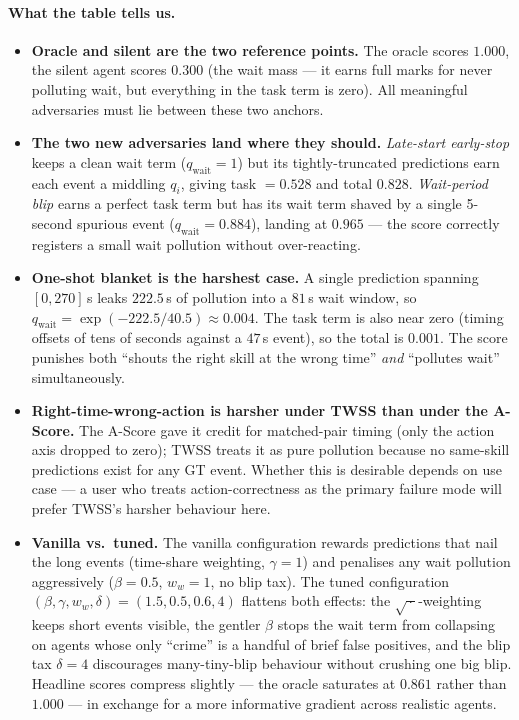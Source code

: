 \documentclass[11pt]{article}
\newcommand{\qi}{q_i}
\newcommand{\qwait}{q_{\text{wait}}}
\begin{document}
\paragraph{What the table tells us.}
\begin{itemize}
  \item \textbf{Oracle and silent are the two reference points.} The
    oracle scores $1.000$, the silent agent scores $0.300$ (the wait
    mass --- it earns full marks for never polluting wait, but
    everything in the task term is zero). All meaningful adversaries
    must lie between these two anchors.
  \item \textbf{The two new adversaries land where they should.}
    \emph{Late-start early-stop} keeps a clean wait term ($\qwait =
    1$) but its tightly-truncated predictions earn each event a
    middling $\qi$, giving task $= 0.528$ and total $0.828$.
    \emph{Wait-period blip} earns a perfect task term but has its
    wait term shaved by a single 5-second spurious event ($\qwait =
    0.884$), landing at $0.965$ --- the score correctly registers a
    small wait pollution without over-reacting.
  \item \textbf{One-shot blanket is the harshest case.} A single
    prediction spanning $[0, 270]$\,s leaks $222.5$\,s of pollution
    into a $81$\,s wait window, so $\qwait = \exp(-222.5 / 40.5)
    \approx 0.004$. The task term is also near zero (timing offsets
    of tens of seconds against a $47$\,s event), so the total is
    $0.001$. The score punishes both ``shouts the right skill at the
    wrong time'' \emph{and} ``pollutes wait'' simultaneously.
  \item \textbf{Right-time-wrong-action is harsher under TWSS than
    under the A-Score.} The A-Score gave it credit for matched-pair
    timing (only the action axis dropped to zero); TWSS treats it as
    pure pollution because no same-skill predictions exist for any
    GT event. Whether this is desirable depends on use case --- a
    user who treats action-correctness as the primary failure mode
    will prefer TWSS's harsher behaviour here.
  \item \textbf{Vanilla vs.\ tuned.} The vanilla configuration
    rewards predictions that nail the long events (time-share
    weighting, $\gamma = 1$) and penalises any wait pollution
    aggressively ($\beta = 0.5$, $w_w = 1$, no blip tax). The tuned
    configuration $(\beta, \gamma, w_w, \delta) = (1.5, 0.5, 0.6,
    4)$ flattens both effects: the $\sqrt{\,\cdot\,}$-weighting
    keeps short events visible, the gentler $\beta$ stops the wait
    term from collapsing on agents whose only ``crime'' is a
    handful of brief false positives, and the blip tax $\delta = 4$
    discourages many-tiny-blip behaviour without crushing one big
    blip. Headline scores compress slightly --- the oracle saturates
    at $0.861$ rather than $1.000$ --- in exchange for a more
    informative gradient across realistic agents.
\end{itemize}
\end{document}
